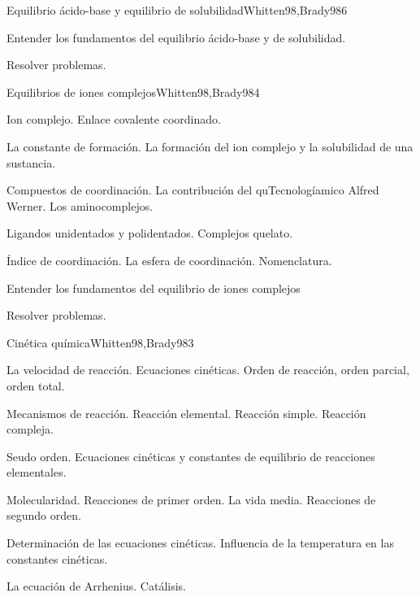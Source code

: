 \begin{syllabus}
\begin{unit}{Equilibrio ácido-base y equilibrio de solubilidad}{Whitten98,Brady98}{6}
\begin{unitgoals}
	\item Entender los fundamentos del equilibrio ácido-base y de solubilidad.
	\item Resolver problemas.
\end{unitgoals}
\end{unit}

\begin{unit}{Equilibrios de iones complejos}{Whitten98,Brady98}{4}
\begin{topics}
	\item Ion complejo. Enlace covalente coordinado.
	\item La constante de formación. La formación del ion complejo y la solubilidad de una sustancia.
	\item Compuestos de coordinación. La contribución del quTecnologíamico Alfred Werner. Los aminocomplejos.
	\item Ligandos unidentados y polidentados. Complejos quelato.
	\item Índice de coordinación. La esfera de coordinación. Nomenclatura.
   \end{topics}

   \begin{unitgoals}
      \item Entender los fundamentos del equilibrio de iones complejos
      \item Resolver problemas.
   \end{unitgoals}
\end{unit}

\begin{unit}{Cinética química}{Whitten98,Brady98}{3}
\begin{topics}
      \item La velocidad de  reacción. Ecuaciones cinéticas. Orden de reacción, orden parcial, orden total.
      \item Mecanismos de reacción. Reacción elemental. Reacción simple. Reacción compleja.
	\item Seudo orden. Ecuaciones cinéticas y constantes de equilibrio de reacciones elementales.
	\item Molecularidad. Reacciones de primer orden. La vida media. Reacciones de segundo orden.
	\item Determinación de las ecuaciones cinéticas. Influencia de la temperatura en las constantes cinéticas.
	\item La ecuación de Arrhenius. Catálisis.
  \end{topics}


\end{unit}
\end{syllabus}
